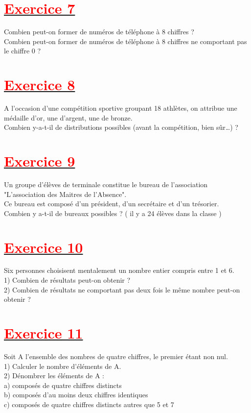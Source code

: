 \documentclass[12pt]{article}
\begin{document}
\section*{\underline{\textbf{\textcolor{red}{Exercice 7}}}}
Combien peut-on former de numéros de téléphone à 8 chiffres ?\\
Combien peut-on former de numéros de téléphone à 8 chiffres ne comportant pas le chiffre 0 ?
\section*{\underline{\textbf{\textcolor{red}{Exercice 8}}}}
A l’occasion d’une compétition sportive groupant 18 athlètes, on attribue une médaille d’or, une d’argent, une de bronze.\\
Combien y-a-t-il de distributions possibles (avant la compétition, bien sûr…) ?
\section*{\underline{\textbf{\textcolor{red}{Exercice 9}}}}
Un groupe d'élèves de terminale constitue le bureau de l'association\\ "L'association des Maitres de l'Absence".\\
Ce bureau est composé d'un président, d'un secrétaire et d'un trésorier.\\
Combien y a-t-il de bureaux possibles ? ( il y a 24 élèves dans la classe )
\section*{\underline{\textbf{\textcolor{red}{Exercice 10}}}}
Six personnes choisisent mentalement un nombre entier compris entre 1 et 6.\\
1) Combien de résultats peut-on obtenir ?\\
2) Combien de résultats ne comportant pas deux fois le même nombre peut-on obtenir ?
\section*{\underline{\textbf{\textcolor{red}{Exercice 11}}}}
Soit A l'ensemble des nombres de quatre chiffres, le premier étant non nul.\\
1) Calculer le nombre d'éléments de A.\\
2) Dénombrer les éléments de A :\\
a) composés de quatre chiffres distincts\\
b) composés d'au moins deux chiffres identiques\\
c) composés de quatre chiffres distincts autres que 5 et 7\\
\end{document}
